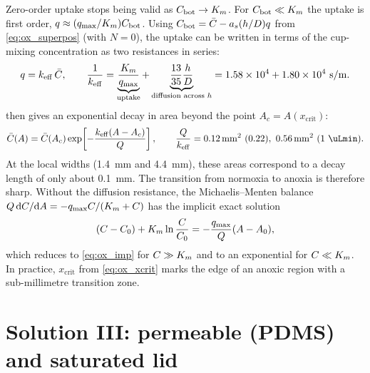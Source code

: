Zero-order uptake stops being valid as $\Cbot\to\Km$. For $\Cbot\ll\Km$ the uptake is first order, $q\approx(\qmax/\Km)\Cbot$. Using $\Cbot=\Cb-a_s(h/D)q$ from \cref{eq:ox_superpos} (with $N=0$), the uptake can be written in terms of the cup-mixing concentration as two resistances in series:
\begin{equation}
q=k_{\mathrm{eff}}\,\Cb,\qquad
\frac{1}{k_{\mathrm{eff}}}=\underbrace{\frac{\Km}{\qmax}}_{\text{uptake}}+\underbrace{\frac{13}{35}\frac hD}_{\text{diffusion across }h}
=\SI{1.58e4}{}+\SI{1.80e4}{}\ \si{s/m}.
\end{equation}
 then gives an exponential decay in area beyond the point $A_c=A(x_{\mathrm{crit}})$:
\begin{equation}
\Cb(A)=\Cb(A_c)\exp\!\left[-\frac{k_{\mathrm{eff}}(A-A_c)}{Q}\right],
\qquad
\frac{Q}{k_{\mathrm{eff}}}=\SI{0.12}{mm^2}\ (0.22),\ \SI{0.56}{mm^2}\ (1\ \si{\uLmin}).
\label{eq:ox_mm_tail}
\end{equation}
At the local widths (\SI{1.4}{mm} and \SI{4.4}{mm}), these areas correspond to a decay length of only about \SI{0.1}{mm}. The transition from normoxia to anoxia is therefore sharp. Without the diffusion resistance, the Michaelis--Menten balance $Q\,\dd C/\dd A=-\qmax C/(\Km+C)$ has the implicit exact solution
\begin{equation}
(C-C_0)+\Km\ln\frac{C}{C_0}=-\frac{\qmax}{Q}(A-A_0),
\label{eq:ox_mm_implicit}
\end{equation}
which reduces to \cref{eq:ox_imp} for $C\gg\Km$ and to an exponential for $C\ll\Km$. In practice, $x_{\mathrm{crit}}$ from \cref{eq:ox_xcrit} marks the edge of an anoxic region with a sub-millimetre transition zone.

\section{Solution III: permeable (PDMS) and saturated lid}
\label{sec:ox_pdms}

